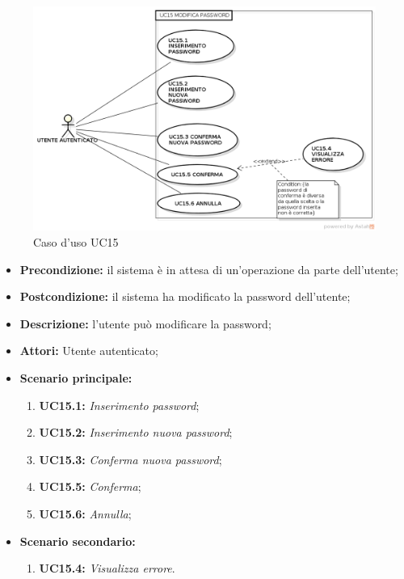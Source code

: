 \begin{figure}[h]
	\begin{center}
	\includegraphics[scale=0.4]{diagram/UC15.png}
	\caption{Caso d'uso UC15}
	\end{center}
\end{figure}
\begin{itemize}
	\item \textbf{Precondizione:} il sistema è in attesa di un'operazione da parte dell'utente;
	\item \textbf{Postcondizione:} il sistema ha modificato la password dell'utente;
	\item \textbf{Descrizione:} l'utente può modificare la password;
	\item \textbf{Attori:} Utente autenticato;
	\item \textbf{Scenario principale:}
	\begin{enumerate}
		\item \textbf{ UC15.1:} \textit{ Inserimento password};
		\item \textbf{ UC15.2:} \textit{ Inserimento nuova password};
		\item \textbf{ UC15.3:} \textit{ Conferma nuova password};
		\item \textbf{ UC15.5:} \textit{ Conferma};
		\item \textbf{ UC15.6:} \textit{ Annulla};
	\end{enumerate}
	\item \textbf{Scenario secondario:}
	\begin{enumerate}
		\item \textbf{ UC15.4:} \textit{ Visualizza errore}.
	\end{enumerate}
\end{itemize}
